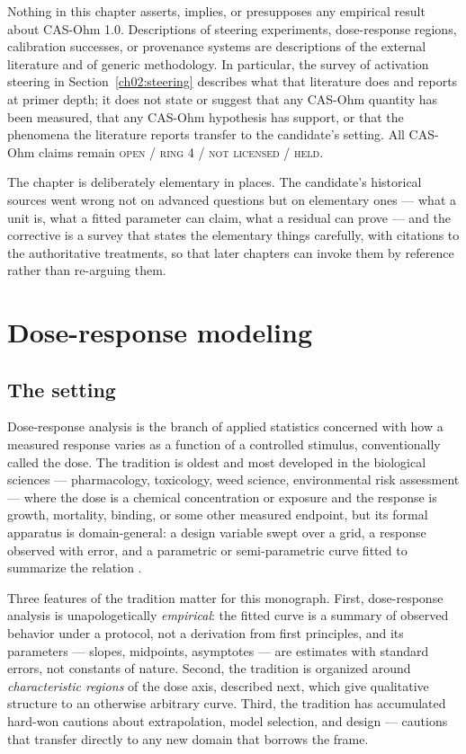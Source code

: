 \begin{ruleenv}\label{ch02:rule:nosmuggle}
Nothing in this chapter asserts, implies, or presupposes any empirical result about CAS-Ohm 1.0. Descriptions of steering experiments, dose-response regions, calibration successes, or provenance systems are descriptions of the external literature and of generic methodology. In particular, the survey of activation steering in Section~\ref{ch02:steering} describes what that literature does and reports at primer depth; it does not state or suggest that any CAS-Ohm quantity has been measured, that any CAS-Ohm hypothesis has support, or that the phenomena the literature reports transfer to the candidate's setting. All CAS-Ohm claims remain \textsc{open / ring 4 / not licensed / held}.
\end{ruleenv}

The chapter is deliberately elementary in places. The candidate's historical sources went wrong not on advanced questions but on elementary ones --- what a unit is, what a fitted parameter can claim, what a residual can prove --- and the corrective is a survey that states the elementary things carefully, with citations to the authoritative treatments, so that later chapters can invoke them by reference rather than re-arguing them.

\section{Dose-response modeling}\label{ch02:dose}

\subsection{The setting}\label{ch02:dose:setting}

Dose-response analysis is the branch of applied statistics concerned with how a measured response varies as a function of a controlled stimulus, conventionally called the dose. The tradition is oldest and most developed in the biological sciences --- pharmacology, toxicology, weed science, environmental risk assessment --- where the dose is a chemical concentration or exposure and the response is growth, mortality, binding, or some other measured endpoint, but its formal apparatus is domain-general: a design variable swept over a grid, a response observed with error, and a parametric or semi-parametric curve fitted to summarize the relation \cite{ritz}.

Three features of the tradition matter for this monograph. First, dose-response analysis is unapologetically \emph{empirical}: the fitted curve is a summary of observed behavior under a protocol, not a derivation from first principles, and its parameters --- slopes, midpoints, asymptotes --- are estimates with standard errors, not constants of nature. Second, the tradition is organized around \emph{characteristic regions} of the dose axis, described next, which give qualitative structure to an otherwise arbitrary curve. Third, the tradition has accumulated hard-won cautions about extrapolation, model selection, and design --- cautions that transfer directly to any new domain that borrows the frame.

